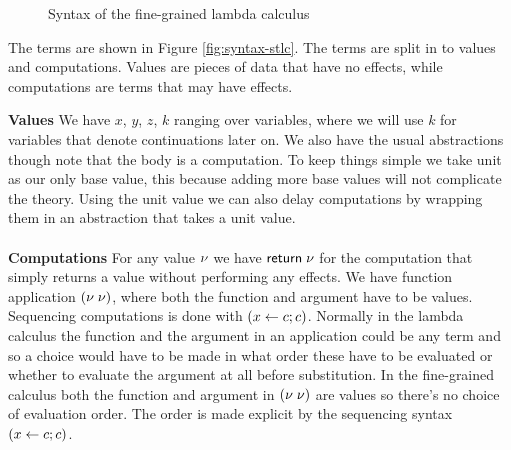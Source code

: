 {%

\begin{figure}
\caption{Syntax of the fine-grained lambda calculus}
\centering
{}
\end{figure}

The terms are shown in Figure \ref{fig:syntax-stlc}.
The terms are split in to values and computations.
Values are pieces of data that have no effects, while computations are terms that may have effects.

\textbf{Values} We have $x$, $y$, $z$, $k$ ranging over variables, where we will use $k$ for variables that denote continuations later on.
We also have the usual abstractions though note that the body is a computation.
To keep things simple we take unit as our only base value, this because adding more base values will not complicate the theory.
Using the unit value we can also delay computations by wrapping them in an abstraction that takes a unit value.
\\\\
\textbf{Computations} For any value $\nu$ we have $\mathsf{return} \; \nu$ for the computation that simply returns a value without performing any effects. We have function application $(\nu \; \nu)$, where both the function and argument have to be values. Sequencing computations is done with $(x \leftarrow c ; c)$. Normally in the lambda calculus the function and the argument in an application could be any term and so a choice would have to be made in what order these have to be evaluated or whether to evaluate the argument at all before substitution. In the fine-grained calculus both the function and argument in $(\nu \; \nu)$ are values so there's no choice of evaluation order. The order is made explicit by the sequencing syntax $(x \leftarrow c ; c)$.

}
